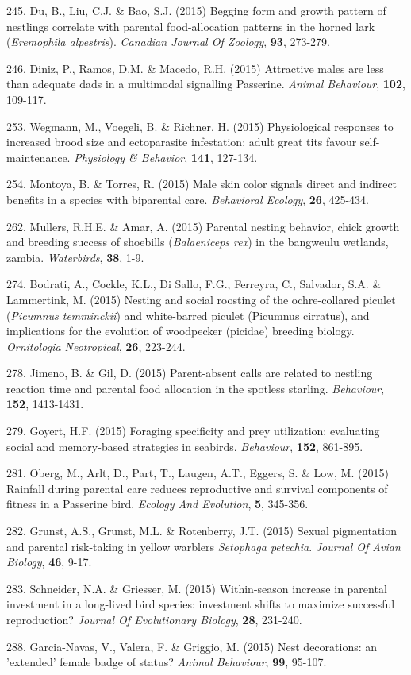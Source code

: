 245. Du, B., Liu, C.J. \&  Bao, S.J. (2015) Begging form and growth pattern of nestlings correlate with parental food-allocation patterns in the horned lark (\textit{Eremophila alpestris}). \textit{Canadian Journal Of Zoology},  \textbf{93}, 273-279.

246. Diniz, P., Ramos, D.M. \&  Macedo, R.H. (2015) Attractive males are less than adequate dads in a multimodal signalling Passerine. \textit{Animal Behaviour},  \textbf{102}, 109-117.

253. Wegmann, M., Voegeli, B. \&  Richner, H. (2015) Physiological responses to increased brood size and ectoparasite infestation: adult great tits favour self-maintenance. \textit{Physiology & Behavior},  \textbf{141}, 127-134.

254. Montoya, B. \&  Torres, R. (2015) Male skin color signals direct and indirect benefits in a species with biparental care. \textit{Behavioral Ecology},  \textbf{26}, 425-434.

262. Mullers, R.H.E. \&  Amar, A. (2015) Parental nesting behavior, chick growth and breeding success of shoebills (\textit{Balaeniceps rex}) in the bangweulu wetlands, zambia. \textit{Waterbirds},  \textbf{38}, 1-9.

274. Bodrati, A., Cockle, K.L., Di Sallo, F.G., Ferreyra, C., Salvador, S.A. \&  Lammertink, M. (2015) Nesting and social roosting of the ochre-collared piculet (\textit{Picumnus temminckii}) and white-barred piculet (Picumnus cirratus), and implications for the evolution of woodpecker (picidae) breeding biology. \textit{Ornitologia Neotropical},  \textbf{26}, 223-244.

278. Jimeno, B. \&  Gil, D. (2015) Parent-absent calls are related to nestling reaction time and parental food allocation in the spotless starling. \textit{Behaviour},  \textbf{152}, 1413-1431.

279. Goyert, H.F. (2015) Foraging specificity and prey utilization: evaluating social and memory-based strategies in seabirds. \textit{Behaviour},  \textbf{152}, 861-895.

281. Oberg, M., Arlt, D., Part, T., Laugen, A.T., Eggers, S. \&  Low, M. (2015) Rainfall during parental care reduces reproductive and survival components of fitness in a Passerine bird. \textit{Ecology And Evolution},  \textbf{5}, 345-356.

282. Grunst, A.S., Grunst, M.L. \&  Rotenberry, J.T. (2015) Sexual pigmentation and parental risk-taking in yellow warblers \textit{Setophaga petechia}. \textit{Journal Of Avian Biology},  \textbf{46}, 9-17.

283. Schneider, N.A. \&  Griesser, M. (2015) Within-season increase in parental investment in a long-lived bird species: investment shifts to maximize successful reproduction? \textit{Journal Of Evolutionary Biology},  \textbf{28}, 231-240.

288. Garcia-Navas, V., Valera, F. \&  Griggio, M. (2015) Nest decorations: an 'extended' female badge of status? \textit{Animal Behaviour},  \textbf{99}, 95-107.

